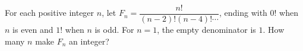 For each positive integer $n$, let $F_n=\dfrac{n!}{(n-2)!(n-4)!\cdots}$, ending with $0!$ when $n$ is even and $1!$ when $n$ is odd. For $n=1$, the empty denominator is $1$. How many $n$ make $F_n$ an integer?
